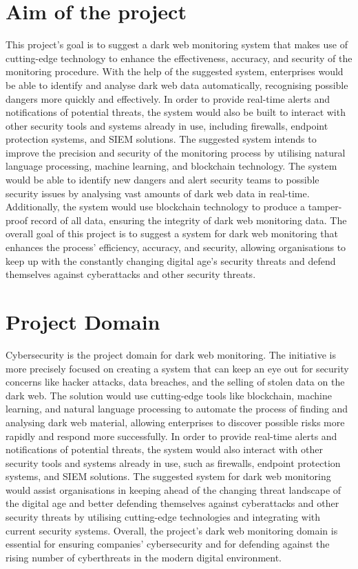 \documentclass[10pt]{report}
\begin{document}
\section{Aim of the project}
\hspace{0.5cm}This project's goal is to suggest a dark web monitoring system that makes use of cutting-edge technology to enhance the effectiveness, accuracy, and security of the monitoring procedure. With the help of the suggested system, enterprises would be able to identify and analyse dark web data automatically, recognising possible dangers more quickly and effectively. In order to provide real-time alerts and notifications of potential threats, the system would also be built to interact with other security tools and systems already in use, including firewalls, endpoint protection systems, and SIEM solutions.
The suggested system intends to improve the precision and security of the monitoring process by utilising natural language processing, machine learning, and blockchain technology. The system would be able to identify new dangers and alert security teams to possible security issues by analysing vast amounts of dark web data in real-time. Additionally, the system would use blockchain technology to produce a tamper-proof record of all data, ensuring the integrity of dark web monitoring data.
The overall goal of this project is to suggest a system for dark web monitoring that enhances the process' efficiency, accuracy, and security, allowing organisations to keep up with the constantly changing digital age's security threats and defend themselves against cyberattacks and other security threats.
\section{Project Domain}
Cybersecurity is the project domain for dark web monitoring. The initiative is more precisely focused on creating a system that can keep an eye out for security concerns like hacker attacks, data breaches, and the selling of stolen data on the dark web. The solution would use cutting-edge tools like blockchain, machine learning, and natural language processing to automate the process of finding and analysing dark web material, allowing enterprises to discover possible risks more rapidly and respond more successfully.
In order to provide real-time alerts and notifications of potential threats, the system would also interact with other security tools and systems already in use, such as firewalls, endpoint protection systems, and SIEM solutions. The suggested system for dark web monitoring would assist organisations in keeping ahead of the changing threat landscape of the digital age and better defending themselves against cyberattacks and other security threats by utilising cutting-edge technologies and integrating with current security systems.
Overall, the project's dark web monitoring domain is essential for ensuring companies' cybersecurity and for defending against the rising number of cyberthreats in the modern digital environment.
\end{document}
